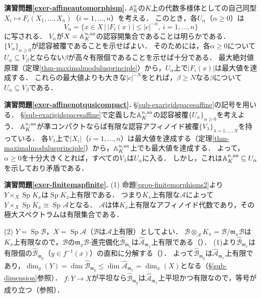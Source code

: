 \documentclass[a4paper,12pt, dvipdfmx]{jsbook}
\def\A{\mathbb{A}}
\def\m{\mathfrak{m}}
\def\Sp{\mathop{\mathrm{Sp}}\nolimits}
\def\an{\textsl{an}}
\newcommand{\abs}[1]{\lvert#1\rvert}
\theoremstyle{plain}
\theoremstyle{definition}
\begin{document}
{\medskip\noindent
{\bf 演習問題\ref{exer-affineautomorphism}.}
$\A^n_K$の$K$上の代数多様体としての自己同型$X_i\mapsto F_i(X_1,\ldots,X_n)$（$i=1,\ldots,n$）を考える．
このとき，各$U_{\alpha}$（$\alpha\geq 0$）は
$$
V_{\alpha}=\{x\in X\,|\,\abs{F_i(x)}\leq\abs{c}^{-\alpha},\ i=1,\ldots,n\}
$$
に写される．
$V_{\alpha}$が$X=\A^{n,\an}_K$の認容開集合であることは明らかである．
$\{V_{\alpha}\}_{\alpha\geq 0}$が認容被覆であることを示せばよい．
そのためには，各$\alpha\geq 0$について$U_{\alpha}\subseteq V_{\beta}$とならない$\beta$が高々有限個であることを示せば十分である．
最大絶対値原理（定理\ref{thm-maximalmodulusprinciple}）から，$U_{\alpha}$上で$\abs{F_i(x)}$は最大値を達成する．
これらの最大値よりも大きな$\abs{c}^{-N}$をとれば，$\beta\geq N$なる$\beta$について$U_{\alpha}\subseteq V_{\beta}$である．

\medskip\noindent
{\bf 演習問題\ref{exer-affinenotqusicompact}.}
\S\ref{sub-exarigidspacesaffine}の記号を用いる．
\S\ref{sub-exarigidspacesaffine}で定義した$\A^{n,\an}_K$の認容被覆$\{U_{\alpha}\}_{\alpha\geq 0}$を考えよう．
$\A^{n,\an}_K$が準コンパクトならば有限な認容アフィノイド被覆$\{V_{\lambda}\}_{\lambda=1,\ldots,N}$を持っている．
各$V_{\lambda}$上で$\abs{X_i}$（$i=1,\ldots,n$）は最大値を達成する（定理\ref{thm-maximalmodulusprinciple}）から，$\A^{n,\an}_K$上でも最大値を達成する．
よって，$\alpha\geq 0$を十分大きくとれば，すべての$V_{\lambda}$は$U_{\alpha}$に入る．
しかし，これは$\A^{n,\an}_K\subseteq U_{\alpha}$を示しており矛盾である．

\medskip\noindent
{\bf 演習問題\ref{exer-finitemapfinite}.}
(1) 命題\ref{prop-finitemorphisms2}より$Y\times_X\Sp K_x$は$\Sp K_x$上有限である．
つまり$K_x$上有限な$\mathcal{A}$によって$Y\times_X\Sp K_x\cong\Sp\mathcal{A}$となる．
$\mathcal{A}$は体$K_x$上有限なアフィノイド代数であり，その極大スペクトラムは有限集合である．

(2) $Y=\Sp\mathcal{B}$，$X=\Sp\mathcal{A}$（$\mathcal{B}$は$\mathcal{A}$上有限）としてよい．
$\mathcal{B}\otimes_{\mathcal{A}}K_x=\mathcal{B}/\m_x\mathcal{B}$は$K_x$上有限なので，$\mathcal{B}$の$\m_x\mathcal{B}$-進完備化$\widehat{\mathcal{B}}_{\m_x}$は$\widehat{\mathcal{A}}_{\m_x}$上有限である（\cite[Theorem 8.4]{Matsu}）．
(1)より$\widehat{\mathcal{B}}_{\m_x}$は有限個の$\widehat{\mathcal{B}}_{\m_y}$（$y\in f^{-1}(x)$）の直和に分解する（\cite[Theorem 8.15]{Matsu}）．
よって$\widehat{\mathcal{B}}_{\m_y}$は$\widehat{\mathcal{A}}_{\m_x}$上有限であり，$\dim_y(Y)=\dim\widehat{\mathcal{B}}_{\m_y}\leq\dim\widehat{\mathcal{A}}_{\m_x}=\dim_x(X)$となる（\S\ref{sub-dimension}参照）．
$f\colon Y\rightarrow X$が平坦なら$\widehat{\mathcal{B}}_{\m_y}$は$\widehat{\mathcal{A}}_{\m_x}$上平坦かつ有限なので，等号が成り立つ（\cite[Chap.\ 5, Exercise 11 (p.\ 68)]{AM}参照）．

}
\end{document}

